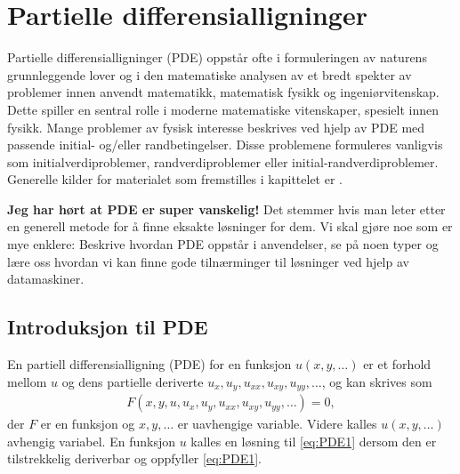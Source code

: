 \chapter{Partielle differensialligninger}
\label{sect:PDE}

Partielle differensialligninger (PDE) oppstår ofte i formuleringen av naturens grunnleggende lover og i den matematiske analysen av et bredt spekter av problemer innen anvendt matematikk, matematisk fysikk og ingeniørvitenskap. Dette spiller en sentral rolle i moderne matematiske vitenskaper, spesielt innen fysikk. Mange problemer av fysisk interesse beskrives ved hjelp av PDE med passende initial- og/eller randbetingelser. Disse problemene formuleres vanligvis som initialverdiproblemer, randverdiproblemer eller initial-randverdiproblemer. Generelle kilder for materialet som fremstilles i kapittelet er \cite{Deb12,LaT03}.

\textbf{Jeg har hørt at PDE er super vanskelig!} Det stemmer hvis man leter etter en generell metode for å finne eksakte løsninger for dem. Vi skal gjøre noe som er mye enklere: Beskrive hvordan PDE oppstår i anvendelser, se på noen typer og lære oss hvordan vi kan finne gode tilnærminger til løsninger ved hjelp av datamaskiner. 

\section{Introduksjon til PDE}

En partiell differensialligning (PDE) for en funksjon \( u(x, y, \ldots) \) er et forhold mellom \( u \) og dens partielle deriverte \( u_x, u_y, u_{xx}, u_{xy}, u_{yy}, \ldots \), og kan skrives som
\begin{align}\label{eq:PDE1}
F(x, y, u, u_x, u_y, u_{xx}, u_{xy}, u_{yy}, \ldots) = 0, 
\end{align}
der \( F \) er en funksjon og \( x, y, \ldots \) er uavhengige variable. Videre kalles \( u(x, y, \ldots) \) avhengig variabel. En funksjon $u$ kalles en løsning til \eqref{eq:PDE1} dersom den er tilstrekkelig deriverbar og oppfyller \eqref{eq:PDE1}.

